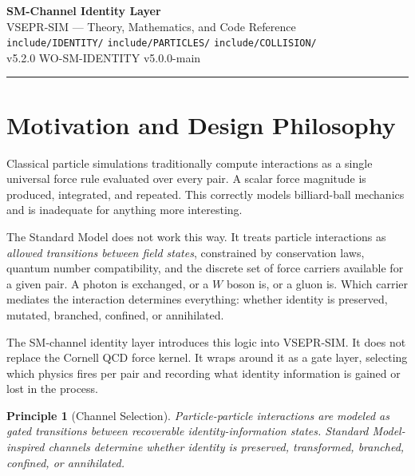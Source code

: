 \documentclass[11pt,a4paper]{article}
\theoremstyle{defbox}
\newtheorem{principle}{Principle}
\begin{document}
\begin{center}
  {\LARGE\bfseries SM-Channel Identity Layer}\\[4pt]
  {\large VSEPR-SIM --- Theory, Mathematics, and Code Reference}\\[2pt]
  {\small\texttt{include/IDENTITY/} \quad \texttt{include/PARTICLES/}
		 \quad \texttt{include/COLLISION/}}\\[6pt]
  {\small v5.2.0 \quad WO-SM-IDENTITY \quad v5.0.0-main}
\end{center}

\vspace{4pt}
\hrule
\vspace{10pt}

\tableofcontents
\newpage

\section{Motivation and Design Philosophy}
\label{sec:motivation}

Classical particle simulations traditionally compute interactions as a single
universal force rule evaluated over every pair.  A scalar force magnitude is
produced, integrated, and repeated.  This correctly models billiard-ball
mechanics and is inadequate for anything more interesting.

The Standard Model does not work this way.  It treats particle interactions as
\emph{allowed transitions between field states}, constrained by conservation
laws, quantum number compatibility, and the discrete set of force carriers
available for a given pair.  A photon is exchanged, or a $W$ boson is, or a
gluon is.  Which carrier mediates the interaction determines everything:
whether identity is preserved, mutated, branched, confined, or annihilated.

The SM-channel identity layer introduces this logic into VSEPR-SIM.  It does
not replace the Cornell QCD force kernel.  It wraps around it as a gate layer,
selecting which physics fires per pair and recording what identity information
is gained or lost in the process.

\begin{principle}[Channel Selection]
Particle-particle interactions are modeled as gated transitions between
recoverable identity-information states.  Standard Model-inspired channels
determine whether identity is preserved, transformed, branched, confined,
or annihilated.
	\end{principle}
\end{document}
